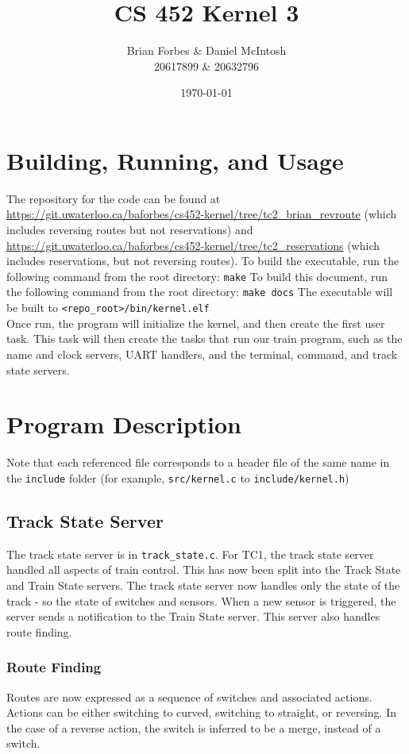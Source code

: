 \documentclass{article}
\begin{document}
\title{CS 452 Kernel 3}
\author{Brian Forbes \& Daniel McIntosh \\ 20617899 \& 20632796}
\date{\today}

\maketitle

\section{ Building, Running, and Usage }

The repository for the code can be found at \url{https://git.uwaterloo.ca/baforbes/cs452-kernel/tree/tc2\_brian\_revroute} (which includes reversing routes but not reservations) and \url{https://git.uwaterloo.ca/baforbes/cs452-kernel/tree/tc2\_reservations} (which includes reservations, but not reversing routes).
To build the executable, run the following command from the root directory: \verb|make|
To build this document, run the following command from the root directory: \verb|make docs|
The executable will be built to \verb|<repo_root>/bin/kernel.elf|\\

Once run, the program will initialize the kernel, and then create the first user task. This task will then create the tasks that run our train program, such as the name and clock servers, UART handlers, and the terminal, command, and track state servers.

\section{Program Description}
Note that each referenced file corresponds to a header file of the same name in the \verb|include| folder (for example, \verb|src/kernel.c| to \verb|include/kernel.h|)

\subsection{ Track State Server}
The track state server is in \verb|track_state.c|.
For TC1, the track state server handled all aspects of train control. This has now been split into the Track State and Train State servers. The track state server now handles only the state of the track - so the state of switches and sensors. When a new sensor is triggered, the server sends a notification to the Train State server. This server also handles route finding.
\subsubsection{ Route Finding }
Routes are now expressed as a sequence of switches and associated actions. Actions can be either switching to curved, switching to straight, or reversing. In the case of a reverse action, the switch is inferred to be a merge, instead of a switch.
\end{document}
